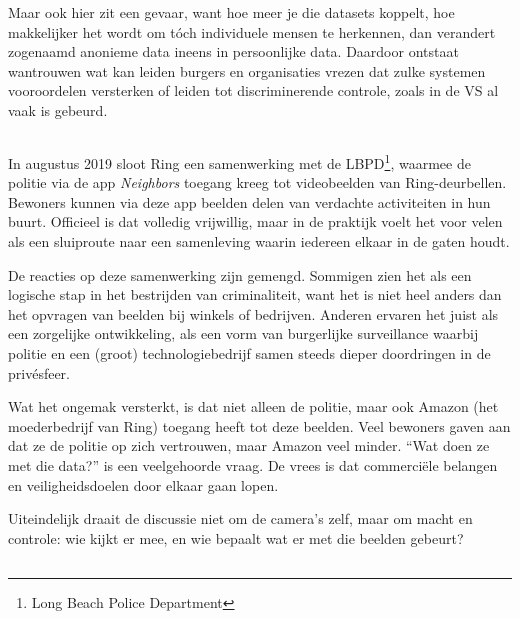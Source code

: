 \documentclass[nonacm,sigconf]{acmart}
\begin{document}
    Maar ook hier zit een gevaar, want hoe meer je die datasets koppelt, hoe makkelijker het wordt om tóch individuele mensen te herkennen, dan verandert zogenaamd anonieme data ineens in persoonlijke data.
    Daardoor ontstaat wantrouwen wat kan leiden burgers en organisaties vrezen dat zulke systemen vooroordelen versterken of leiden tot discriminerende controle, zoals in de VS al vaak is gebeurd.

    \subsection{}
    \parencite{shaffer2021applying} In augustus 2019 sloot Ring een samenwerking met de LBPD\footnote{Long Beach Police Department}, waarmee de politie via de app \textit{Neighbors} toegang kreeg tot videobeelden van Ring-deurbellen. Bewoners kunnen via deze app beelden delen van verdachte activiteiten in hun buurt. Officieel is dat volledig vrijwillig, maar in de praktijk voelt het voor velen als een sluiproute naar een samenleving waarin iedereen elkaar in de gaten houdt.

    De reacties op deze samenwerking zijn gemengd.
    Sommigen zien het als een logische stap in het bestrijden van criminaliteit, want het is niet heel anders dan het opvragen van beelden bij winkels of bedrijven.
    Anderen ervaren het juist als een zorgelijke ontwikkeling, als een vorm van burgerlijke surveillance waarbij politie en een (groot) technologiebedrijf samen steeds dieper doordringen in de privésfeer.

    Wat het ongemak versterkt, is dat niet alleen de politie, maar ook Amazon (het moederbedrijf van Ring) toegang heeft tot deze beelden.
    Veel bewoners gaven aan dat ze de politie op zich vertrouwen, maar Amazon veel minder. “Wat doen ze met die data?” is een veelgehoorde vraag.
    De vrees is dat commerciële belangen en veiligheidsdoelen door elkaar gaan lopen.

    Uiteindelijk draait de discussie niet om de camera’s zelf, maar om macht en controle: wie kijkt er mee, en wie bepaalt wat er met die beelden gebeurt?

    \subsection{}
\end{document}
